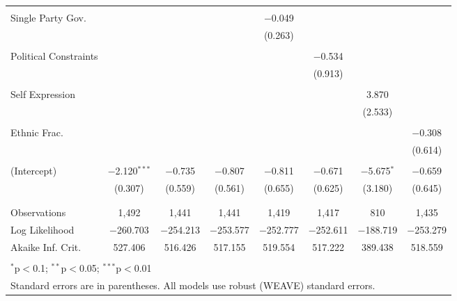 \documentclass[a4paper]{article}\usepackage[]{graphicx}\usepackage[]{color}
\begin{document}
\begin{table}
\begin{center}
{\begin{tabular}{@{\extracolsep{5pt}}lccccccc}
  & & & & & & & \\ 
 Single Party Gov. &  &  &  & $-$0.049 &  &  &  \\ 
  &  &  &  & (0.263) &  &  &  \\ 
  & & & & & & & \\ 
 Political Constraints &  &  &  &  & $-$0.534 &  &  \\ 
  &  &  &  &  & (0.913) &  &  \\ 
  & & & & & & & \\ 
 Self Expression &  &  &  &  &  & 3.870 &  \\ 
  &  &  &  &  &  & (2.533) &  \\ 
  & & & & & & & \\ 
 Ethnic Frac. &  &  &  &  &  &  & $-$0.308 \\ 
  &  &  &  &  &  &  & (0.614) \\ 
  & & & & & & & \\ 
 (Intercept) & $-$2.120$^{***}$ & $-$0.735 & $-$0.807 & $-$0.811 & $-$0.671 & $-$5.675$^{*}$ & $-$0.659 \\ 
  & (0.307) & (0.559) & (0.561) & (0.655) & (0.625) & (3.180) & (0.645) \\ 
  & & & & & & & \\ 
\hline \\[-1.8ex] 
Observations & 1,492 & 1,441 & 1,441 & 1,419 & 1,417 & 810 & 1,435 \\ 
Log Likelihood & $-$260.703 & $-$254.213 & $-$253.577 & $-$252.777 & $-$252.611 & $-$188.719 & $-$253.279 \\ 
Akaike Inf. Crit. & 527.406 & 516.426 & 517.155 & 519.554 & 517.222 & 389.438 & 518.559 \\ 
\hline 
\hline \\[-1.8ex] 
\multicolumn{8}{l}{$^{*}$p$<$0.1; $^{**}$p$<$0.05; $^{***}$p$<$0.01} \\ 
\multicolumn{8}{l}{Standard errors are in parentheses. All models use robust (WEAVE) standard errors.} \\ 
\end{tabular} 

}
\end{center}
\end{table}
\end{document}
